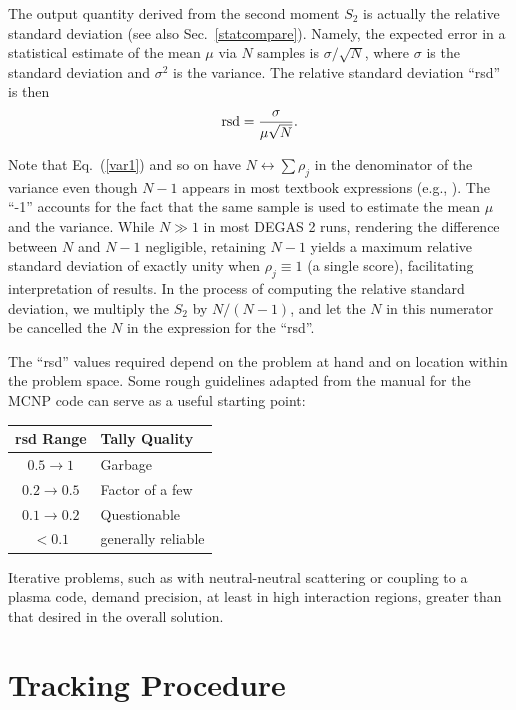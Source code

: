 \documentclass[12pt]{report}
\begin{document}
The output quantity derived from the second
moment $S_{2}$ is actually the
relative standard deviation (see also
Sec.~\ref{statcompare}).  Namely, the expected
error in a statistical estimate of the mean $\mu$
via $N$ samples is $\sigma / \sqrt{N}$, where
$\sigma$ is the standard deviation and $\sigma^{2}$ 
is the variance.  
The relative standard deviation ``rsd'' is then
\begin{equation}
{\rm rsd} = \frac{\sigma}{\mu \sqrt{N}}.
\end{equation}

Note that Eq.~(\ref{var1}) and so on have 
$N \leftrightarrow \sum \rho_{j}$ in the denominator
of the variance even though $N-1$
appears in most textbook expressions (e.g., \cite{Bran2014}).
The ``-1'' accounts for the fact that the 
same sample is used to estimate the mean $\mu$ and the variance.
While $N \gg 1$ in most DEGAS 2 runs, rendering the difference
between $N$ and $N-1$ negligible, retaining $N-1$
yields a maximum relative standard deviation of exactly
unity when $\rho_{j} \equiv 1$ (a single score), facilitating interpretation of 
results.  In the process of computing the relative
standard deviation, we multiply the 
$S_{2}$ by $N/(N-1)$, and let the $N$ in this numerator
be cancelled the $N$ in the expression for the ``rsd''.

The ``rsd'' values required depend on the problem at hand
and on location within the problem space.  Some rough guidelines adapted
from the manual for the MCNP \cite{MCNP}  code can serve as a 
useful starting point:

\begin{center}
\begin{tabular}{cl}
rsd Range  &  Tally Quality  \\ \hline
$0.5 \rightarrow 1$ & Garbage  \\
$0.2 \rightarrow 0.5$ & Factor of a few  \\
$0.1 \rightarrow 0.2$ & Questionable \\
$< 0.1$ & generally reliable \\ 
\end{tabular}
\end{center}

Iterative problems, such as with neutral-neutral scattering
or coupling to a plasma code, demand 
precision, at least in high interaction regions,
greater than that desired in the overall solution.

\section{Tracking Procedure}
\label{TrackingProcedure}
\end{document}
